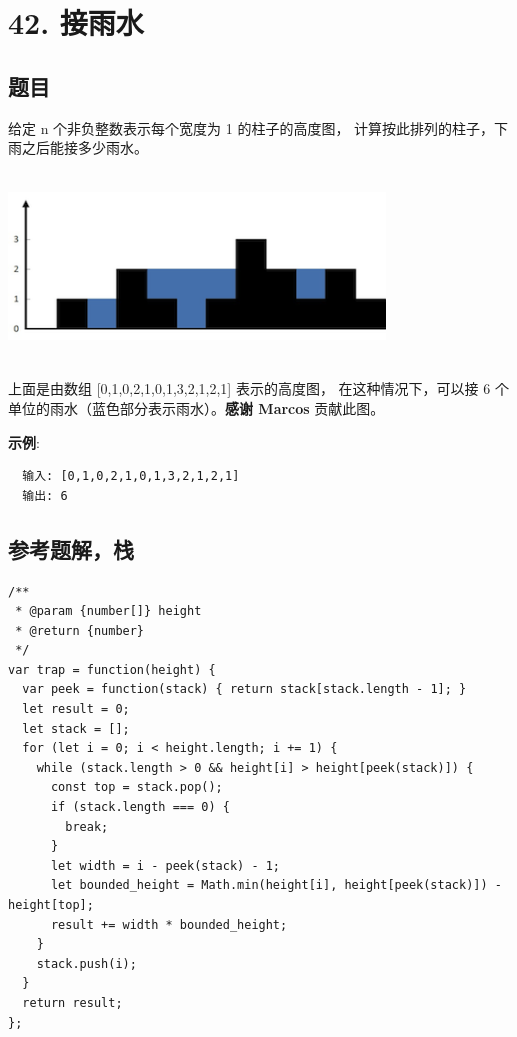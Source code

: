 \newpage
\section{42. 接雨水}
\label{leetcode:42}

\subsection{题目}

给定 n 个非负整数表示每个宽度为 1 的柱子的高度图，
计算按此排列的柱子，下雨之后能接多少雨水。

\includegraphics[width=100mm,height=50mm]{images/leetcode/rainwatertrap.png}

上面是由数组 [0,1,0,2,1,0,1,3,2,1,2,1] 表示的高度图，
在这种情况下，可以接 6 个单位的雨水（蓝色部分表示雨水）。\textbf{感谢 Marcos} 贡献此图。

\textbf{示例}:

\begin{verbatim}
  输入: [0,1,0,2,1,0,1,3,2,1,2,1]
  输出: 6
\end{verbatim}

\subsection{参考题解，栈}

\begin{verbatim}
/**
 * @param {number[]} height
 * @return {number}
 */
var trap = function(height) {
  var peek = function(stack) { return stack[stack.length - 1]; }
  let result = 0;
  let stack = [];
  for (let i = 0; i < height.length; i += 1) {
    while (stack.length > 0 && height[i] > height[peek(stack)]) {
      const top = stack.pop();
      if (stack.length === 0) {
        break;
      }
      let width = i - peek(stack) - 1;
      let bounded_height = Math.min(height[i], height[peek(stack)]) - height[top];
      result += width * bounded_height;
    }
    stack.push(i);
  }
  return result;
};
\end{verbatim}
